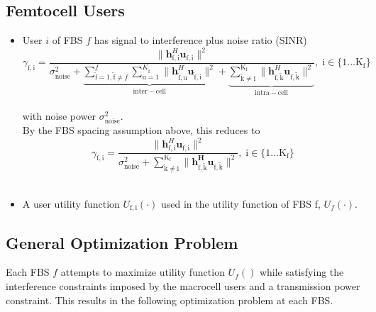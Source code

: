 \documentclass[12pt,a4paper]{report}
\begin{document}
\subsection{Femtocell Users}
\begin{itemize}

\item User $i$ of FBS $f$ has signal to interference plus noise ratio (SINR)
	\begin{equation*}
	\gamma_{\mathrm{f,i}} = \frac{\|\mathbf{h}^H_{\mathrm{f,i}}\mathbf{u}_{\mathrm{f,i}}\|^2}
	{\sigma^2_{\text{noise}}   +
	\underbrace{
	 \sum_{\mathrm{\tilde{f}}=1,\mathrm{\tilde{f}}\neq f}^{f} \sum_{\mathrm{u=1}}^{K_{\mathrm{\tilde{f}}}}
	\|\mathbf{h}^H_{\mathrm{\tilde{f},u}}\mathbf{u}_{\mathrm{\tilde{f},i}}\|^2}_{\mathrm{inter-cell}}
	 + 
	 \underbrace{
	 \sum_{\mathrm{\tilde{k}\neq i}}^{\mathrm{K_f}}
	 \|\mathbf{h}^H_{\mathrm{f,\tilde{k}}}\mathbf{u}_{\mathrm{f,\tilde{k}}}\|^2}_{\mathrm{intra-cell}}},
	  \; \mathrm{i \in \{1 ... K_f\}}
	  \end{equation*}
\\
with noise power $\sigma^2_{\text{noise}}.$
\\

By the FBS spacing assumption above, this reduces to
	\begin{equation*}
	\gamma_{\mathrm{f,i}} = \frac{\|\mathbf{h}^H_{\mathrm{f,i}}\mathbf{u}_{\mathrm{f,i}}\|^2}
	{\sigma^2_{\text{noise}} 
	 + \sum_{\mathrm{\tilde{k}\neq i}}^{\mathrm{K_f}}
	  \|\mathbf{h^H_{\mathrm{f,\tilde{k}}}u_{\mathrm{f,\tilde{k}}}}\|^2},
	  \; \mathrm{i \in \{1 ... K_f\}}
	\end{equation*}
\\
\item 
A user utility function $U_{\mathrm{f,i}}(\cdot)$ used in the utility function of FBS f, $U_{f}(\cdot)$. 

\end{itemize}





\subsection{General Optimization Problem}\label{genproblem}

Each FBS $f$ attempts to maximize utility function $U_{f}()$ while satisfying the interference constraints imposed by the macrocell users and a transmission power constraint. This results in the following optimization problem at each FBS.
\par
\end{document}

